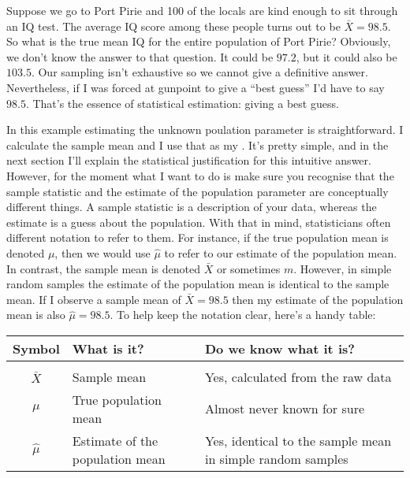 Suppose we go to Port Pirie and 100 of the locals are kind enough to sit through an IQ test. The average IQ score among these people turns out to be $\bar{X}=98.5$. So what is the true mean IQ for the entire population of Port Pirie? Obviously, we don't know the answer to that question. It could be $97.2$, but it could also be $103.5$. Our sampling isn't exhaustive so we cannot give a definitive answer. Nevertheless, if I was forced at gunpoint to give a ``best guess'' I'd have to say $98.5$. That's the essence of statistical estimation: giving a best guess. 

In this example estimating the unknown poulation parameter is straightforward. I calculate the sample mean and I use that as my . It's pretty simple, and in the next section I'll explain the statistical justification for this intuitive answer. However, for the moment what I want to do is make sure you recognise that the sample statistic and the estimate of the population parameter are conceptually different things. A sample statistic is a description of your data, whereas the estimate is a guess about the population. With that in mind, statisticians often different notation to refer to them. For instance, if the true population mean is denoted $\mu$, then we would use $\hat\mu$ to refer to our estimate of the population mean. In contrast, the sample mean is denoted $\bar{X}$ or sometimes $m$. However, in simple random samples the estimate of the population mean is identical to the sample mean. If I observe a sample mean of $\bar{X} = 98.5$ then my estimate of the population mean is also $\hat\mu = 98.5$. To help keep the notation clear, here's a handy table:

\smallskip
\begin{center}
\small 
\begin{tabular}{clp{6cm}}
\hline
Symbol      & What is it?                     & Do we know what it is?                                     \\
\hline\\[-6pt]
$\bar{X}$   & Sample mean                     & Yes, calculated from the raw data                          \\
$\mu$       & True population mean            & Almost never known for sure                                \\
$\hat{\mu}$ & Estimate of the population mean & Yes, identical to the sample mean in simple random samples \\
\hline
\end{tabular}
\end{center}

